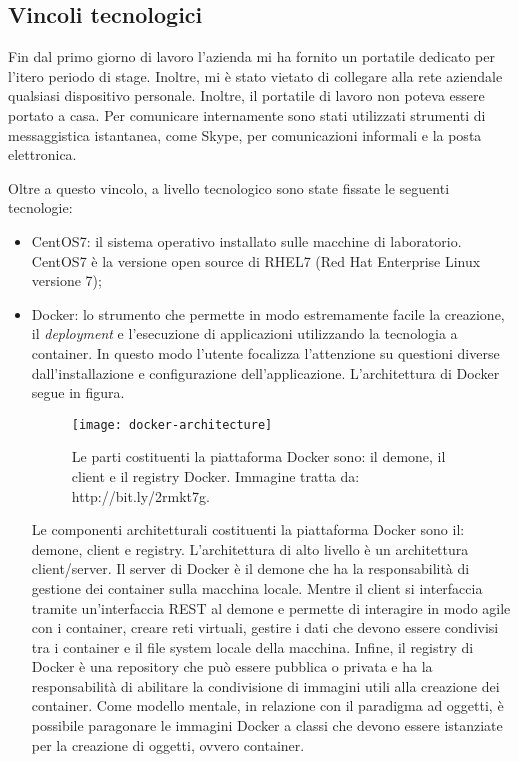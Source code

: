 \subsection{Vincoli tecnologici}

Fin dal primo giorno di lavoro l'azienda mi ha fornito un portatile dedicato 
per l'itero periodo di stage. Inoltre, mi è stato vietato di collegare alla 
rete aziendale qualsiasi dispositivo personale. Inoltre, il portatile di lavoro 
non poteva essere portato a casa.
Per comunicare internamente sono stati utilizzati strumenti di messaggistica 
istantanea, come Skype, per comunicazioni informali e la posta elettronica.

Oltre a questo vincolo, a livello tecnologico sono state fissate le seguenti 
tecnologie:

\begin{itemize}
	\item CentOS7: il sistema operativo installato sulle macchine di 
laboratorio. CentOS7 è la versione open source di RHEL7 (Red Hat Enterprise 
Linux versione 7);
	\item Docker: lo strumento che permette in modo estremamente facile la 
creazione, il \textit{deployment} e l'esecuzione di applicazioni utilizzando la 
tecnologia a container. In questo modo l'utente focalizza l'attenzione su 
questioni diverse dall'installazione e configurazione dell'applicazione. 
	L'architettura di Docker segue in figura. 
	
	\begin{figure}[htbp]
		\begin{center}
			\texttt{[image: docker-architecture]}
			\caption{Le parti costituenti la piattaforma Docker 
sono: il demone, il client e il registry Docker. Immagine tratta da: 
http://bit.ly/2rmkt7g.}
		\end{center}
	\end{figure}
	
	Le componenti architetturali costituenti la piattaforma Docker sono il:
	demone, client e registry. L'architettura di alto livello è 
	un architettura client/server. Il server di Docker è il demone che ha 
la responsabilità di gestione dei container sulla macchina locale. Mentre il 
client si interfaccia tramite un'interfaccia REST al demone e permette di 
interagire in modo agile con i container, creare reti virtuali, gestire i dati 
che devono essere condivisi tra i container e il file system locale della 
macchina. Infine, il registry di Docker è una repository che può essere 
pubblica o privata e ha la responsabilità di abilitare la condivisione di 
immagini utili alla creazione dei container. Come modello mentale, in relazione 
con il paradigma ad oggetti, è possibile paragonare le immagini Docker a classi 
che devono essere istanziate per la creazione di oggetti, ovvero container. 
	

\end{itemize}

